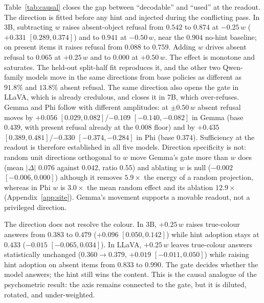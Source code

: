\documentclass[10pt]{article}
\newcommand{\wdir}{w}
\begin{document}
Table~\ref{tab:causal} closes the gap between ``decodable'' and ``used'' at the readout. The direction is fitted before any hint and injected during the conflicting pass. In 3B, subtracting $\wdir$ raises absent-object refusal from $0.542$ to $0.874$ at $-0.25\,\wdir$ ($+0.331$ $[0.289,0.374]$) and to $0.941$ at $-0.50\,\wdir$, near the $0.904$ no-hint baseline; on present items it raises refusal from $0.088$ to $0.759$. Adding $\wdir$ drives absent refusal to $0.065$ at $+0.25\,\wdir$ and to $0.000$ at $+0.50\,\wdir$. The effect is monotone and saturates. The held-out split-half fit reproduces it, and the other two Qwen-family models move in the same directions from base policies as different as $91.8\%$ and $13.8\%$ absent refusal. The same direction also opens the gate in LLaVA, which is already credulous, and closes it in 7B, which over-refuses. Gemma and Phi follow with different amplitudes: at $\pm0.50\,\wdir$ absent refusal moves by $+0.056$ $[0.029,0.082]$/$-0.109$ $[-0.140,-0.082]$ in Gemma (base $0.439$, with present refusal already at the $0.008$ floor) and by $+0.435$ $[0.389,0.481]$/$-0.330$ $[-0.374,-0.284]$ in Phi (base $0.374$). Sufficiency at the readout is therefore established in all five models. Direction specificity is not: random unit directions orthogonal to $\wdir$ move Gemma's gate more than $\wdir$ does (mean $|\Delta|$ $0.076$ against $0.042$, ratio $0.55$) and ablating $\wdir$ is null ($-0.002$ $[-0.006,0.000]$) although it removes $5.9\times$ the energy of a random projection, whereas in Phi $\wdir$ is $3.0\times$ the mean random effect and its ablation $12.9\times$ (Appendix~\ref{app:site}). Gemma's movement supports a movable readout, not a privileged direction.

The direction does not resolve the colour. In 3B, $+0.25\,\wdir$ raises true-colour answers from $0.383$ to $0.479$ ($+0.096$ $[0.050,0.142]$) while hint adoption stays at $0.433$ ($-0.015$ $[-0.065,0.034]$). In LLaVA, $+0.25\,\wdir$ leaves true-colour answers statistically unchanged ($0.360\to0.379$, $+0.019$ $[-0.011,0.050]$) while raising hint adoption on absent items from $0.833$ to $0.990$. The gate decides whether the model answers; the hint still wins the content. This is the causal analogue of the psychometric result: the axis remains connected to the gate, but it is diluted, rotated, and under-weighted.
\end{document}
